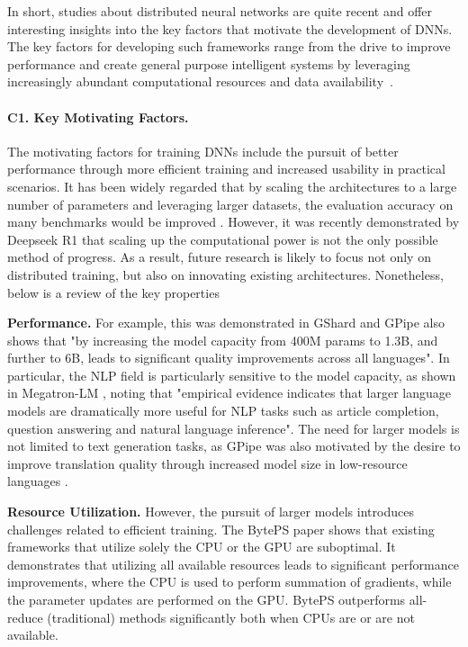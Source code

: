 In short, studies about distributed neural networks are quite recent and offer interesting insights
into the key factors that motivate the development of DNNs. The key factors for developing such
frameworks range from the drive to improve performance and create general purpose intelligent
systems by leveraging increasingly abundant computational resources and data
availability~\cite{chen_mxnet_2015,lepikhin_gshard_2020,shoeybi_megatron-lm_2020}.

\paragraph{C1. Key Motivating Factors.}
The motivating factors for training DNNs include the pursuit of better performance through more
efficient training and increased usability in practical scenarios. It has been widely regarded that
by scaling the architectures to a large number of parameters and leveraging larger datasets, the
evaluation accuracy on many benchmarks would be improved \cite{hestness_deep_2017}. However, it was
recently demonstrated by Deepseek R1
\cite{deepseekai2025deepseekr1incentivizingreasoningcapability} that scaling up the computational
power is not the only possible method of progress. As a result, future research is likely to focus
not only on distributed training, but also on innovating existing architectures. Nonetheless, below
is a review of the key properties

\textbf{Performance.}
For example, this was demonstrated in GShard \cite{kaplan_scaling_2020} and GPipe
\cite{huang_gpipe_2019} also shows that "by increasing the model capacity from 400M params to 1.3B,
and further to 6B, leads to significant quality improvements across all languages". In particular,
the NLP field is particularly sensitive to the model capacity, as shown in Megatron-LM
\cite{shoeybi_megatron-lm_2020}, noting that "empirical evidence indicates that larger language
models are dramatically more useful for NLP tasks such as article completion, question answering
and natural language inference". The need for larger models is not limited to text generation
tasks, as GPipe was also motivated by the desire to improve translation quality through increased
model size in low-resource languages \cite{huang_gpipe_2019}.

\textbf{Resource Utilization.}
However, the pursuit of larger models introduces challenges related to efficient training. The
BytePS paper \cite{jiang_unified_nodate} shows that existing frameworks that utilize solely the
CPU or the GPU are suboptimal. It demonstrates that utilizing all available resources leads to
significant performance improvements, where the CPU is used to perform summation of gradients,
while the parameter updates are performed on the GPU. BytePS outperforms all-reduce (traditional)
methods significantly both when CPUs are or are not available.

